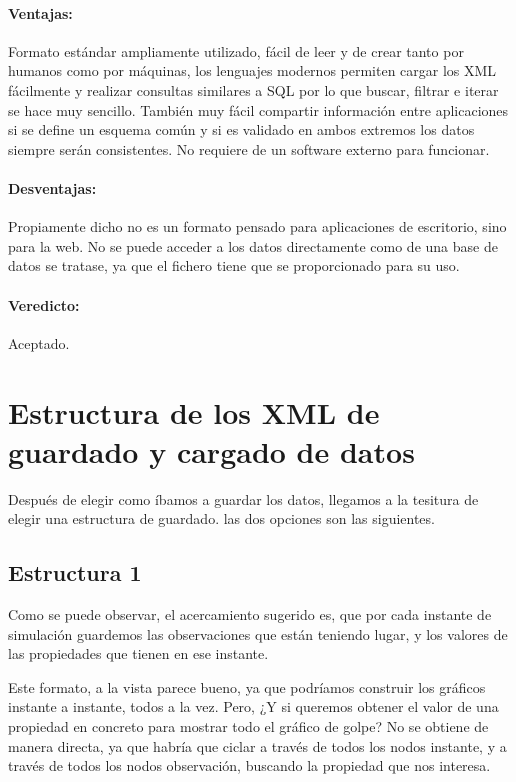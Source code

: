 \paragraph{Ventajas:} Formato est\'{a}ndar ampliamente utilizado, f\'{a}cil de leer y de crear tanto por humanos como por m\'{a}quinas, los
lenguajes modernos permiten cargar los XML f\'{a}cilmente y realizar consultas similares a SQL por lo que buscar, filtrar e iterar se hace muy sencillo.
Tambi\'{e}n muy f\'{a}cil compartir informaci\'{o}n entre aplicaciones si se define un esquema com\'{u}n y si es validado en ambos extremos los datos
siempre ser\'{a}n consistentes. No requiere de un software externo para funcionar.

\paragraph{Desventajas:} Propiamente dicho no es un formato pensado para aplicaciones de escritorio, sino para la web. No se puede acceder a los datos 
directamente como de una base de datos se tratase, ya que el fichero tiene que se proporcionado para su uso.
\paragraph{Veredicto:} Aceptado.

\section{Estructura de los XML de guardado y cargado de datos}
Despu\'{e}s de elegir como \'{i}bamos a guardar los datos, llegamos a la tesitura de elegir una estructura de guardado. las dos opciones son las
siguientes. 
\subsection{Estructura 1}


Como se puede observar, el acercamiento sugerido es, que por cada instante de simulaci\'{o}n guardemos las observaciones que est\'{a}n teniendo lugar,
y los valores de las propiedades que tienen en ese instante.

Este formato, a la vista parece bueno, ya que podr\'{i}amos construir los gr\'{a}ficos instante a instante, todos a la vez. Pero, ¿Y si queremos
obtener el valor de una propiedad en concreto para mostrar todo el gr\'{a}fico de golpe? No se obtiene de manera directa, ya que habr\'{i}a que ciclar
a trav\'{e}s de todos los nodos instante, y a trav\'{e}s de todos los nodos observaci\'{o}n, buscando la propiedad que nos interesa. 

